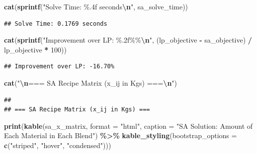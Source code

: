 \documentclass[
]{article}
\newenvironment{Shaded}{\begin{snugshade}}{\end{snugshade}}
\newcommand{\AttributeTok}[1]{\textcolor[rgb]{0.13,0.29,0.53}{#1}}
\newcommand{\DecValTok}[1]{\textcolor[rgb]{0.00,0.00,0.81}{#1}}
\newcommand{\FunctionTok}[1]{\textcolor[rgb]{0.13,0.29,0.53}{\textbf{#1}}}
\newcommand{\NormalTok}[1]{#1}
\newcommand{\SpecialCharTok}[1]{\textcolor[rgb]{0.81,0.36,0.00}{\textbf{#1}}}
\newcommand{\StringTok}[1]{\textcolor[rgb]{0.31,0.60,0.02}{#1}}
\begin{document}
\begin{Shaded}
\begin{Highlighting}[]
\FunctionTok{cat}\NormalTok{(}\FunctionTok{sprintf}\NormalTok{(}\StringTok{"Solve Time: \%.4f seconds}\SpecialCharTok{\textbackslash{}n}\StringTok{"}\NormalTok{, sa\_solve\_time))}
\end{Highlighting}
\end{Shaded}

\begin{verbatim}
## Solve Time: 0.1769 seconds
\end{verbatim}

\begin{Shaded}
\begin{Highlighting}[]
\FunctionTok{cat}\NormalTok{(}\FunctionTok{sprintf}\NormalTok{(}\StringTok{"Improvement over LP: \%.2f\%\%}\SpecialCharTok{\textbackslash{}n}\StringTok{"}\NormalTok{, }
\NormalTok{            (lp\_objective }\SpecialCharTok{{-}}\NormalTok{ sa\_objective) }\SpecialCharTok{/}\NormalTok{ lp\_objective }\SpecialCharTok{*} \DecValTok{100}\NormalTok{))}
\end{Highlighting}
\end{Shaded}

\begin{verbatim}
## Improvement over LP: -16.70%
\end{verbatim}

\begin{Shaded}
\begin{Highlighting}[]
\FunctionTok{cat}\NormalTok{(}\StringTok{"}\SpecialCharTok{\textbackslash{}n}\StringTok{=== SA Recipe Matrix (x\_ij in Kgs) ===}\SpecialCharTok{\textbackslash{}n}\StringTok{"}\NormalTok{)}
\end{Highlighting}
\end{Shaded}

\begin{verbatim}
## 
## === SA Recipe Matrix (x_ij in Kgs) ===
\end{verbatim}

\begin{Shaded}
\begin{Highlighting}[]
\FunctionTok{print}\NormalTok{(}\FunctionTok{kable}\NormalTok{(sa\_x\_matrix, }\AttributeTok{format =} \StringTok{"html"}\NormalTok{, }
            \AttributeTok{caption =} \StringTok{"SA Solution: Amount of Each Material in Each Blend"}\NormalTok{) }\SpecialCharTok{\%\textgreater{}\%}
      \FunctionTok{kable\_styling}\NormalTok{(}\AttributeTok{bootstrap\_options =} \FunctionTok{c}\NormalTok{(}\StringTok{"striped"}\NormalTok{, }\StringTok{"hover"}\NormalTok{, }\StringTok{"condensed"}\NormalTok{)))}
\end{Highlighting}
\end{Shaded}
\end{document}

